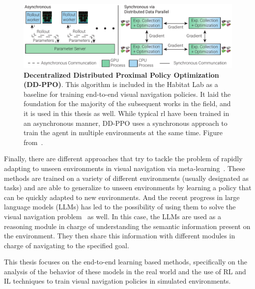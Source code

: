 \begin{figure}
    \centering
    \includegraphics[width=\textwidth]{figures/related_work/ddppo}
    \caption{\textbf{Decentralized Distributed Proximal Policy Optimization (DD-PPO)}.
    This algorithm is included in the Habitat Lab as a baseline for training end-to-end visual navigation policies.
    It laid the foundation for the majority of the subsequent works in the field, and it is used in this thesis as well.
    While typical \acrshort{rl} have been trained in an asynchronous manner, DD-PPO uses a synchronous approach to train the agent in multiple environments at the same time.
    Figure from~\cite{wijmans2020}.}
    \label{fig:ddppo}
\end{figure}

Finally, there are different approaches that try to tackle the problem of rapidly adapting to unseen environments in visual navigation via meta-learning~\cite{wortsman2019, luo2021, zhang2022}.
These methods are trained on a variety of different environments (usually designated as tasks) and are able to generalize to unseen environments by learning a policy that can be quickly adapted to new environments.
And the recent progress in large language models (LLMs) has led to the possibility of using them to solve the visual navigation problem~\cite{Huang2023, Zhou2023} as well.
In this case, the LLMs are used as a reasoning module in charge of understanding the semantic information present on the environment.
They then share this information with different modules in charge of navigating to the specified goal.

This thesis focuses on the end-to-end learning based methods, specifically on the analysis of the behavior of these models in the real world and the use of RL and IL techniques to train visual navigation policies in simulated environments.

